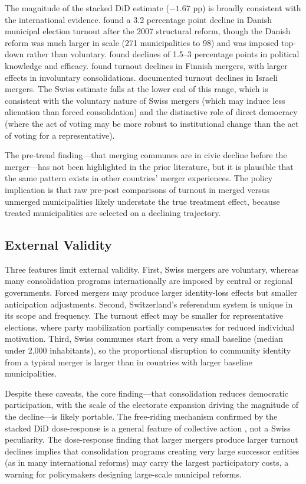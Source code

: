 \documentclass[12pt]{article}
\begin{document}
The magnitude of the stacked DiD estimate ($-1.67$ pp) is broadly consistent with the international evidence. \citet{lassen2011institutional} found a 3.2 percentage point decline in Danish municipal election turnout after the 2007 structural reform, though the Danish reform was much larger in scale (271 municipalities to 98) and was imposed top-down rather than voluntary. \citet{blomhansen2016municipal} found declines of 1.5--3 percentage points in political knowledge and efficacy. \citet{harjunen2021political} found turnout declines in Finnish mergers, with larger effects in involuntary consolidations. \citet{reingewertz2012political} documented turnout declines in Israeli mergers. The Swiss estimate falls at the lower end of this range, which is consistent with the voluntary nature of Swiss mergers (which may induce less alienation than forced consolidation) and the distinctive role of direct democracy (where the act of voting may be more robust to institutional change than the act of voting for a representative).

The pre-trend finding---that merging communes are in civic decline before the merger---has not been highlighted in the prior literature, but it is plausible that the same pattern exists in other countries' merger experiences. The policy implication is that raw pre-post comparisons of turnout in merged versus unmerged municipalities likely understate the true treatment effect, because treated municipalities are selected on a declining trajectory.

\subsection{External Validity}

Three features limit external validity. First, Swiss mergers are voluntary, whereas many consolidation programs internationally are imposed by central or regional governments. Forced mergers may produce larger identity-loss effects but smaller anticipation adjustments. Second, Switzerland's referendum system is unique in its scope and frequency. The turnout effect may be smaller for representative elections, where party mobilization partially compensates for reduced individual motivation. Third, Swiss communes start from a very small baseline (median under 2,000 inhabitants), so the proportional disruption to community identity from a typical merger is larger than in countries with larger baseline municipalities.

Despite these caveats, the core finding---that consolidation reduces democratic participation, with the scale of the electorate expansion driving the magnitude of the decline---is likely portable. The free-riding mechanism confirmed by the stacked DiD dose-response is a general feature of collective action \citep{olson1965logic}, not a Swiss peculiarity. The dose-response finding that larger mergers produce larger turnout declines implies that consolidation programs creating very large successor entities (as in many international reforms) may carry the largest participatory costs, a warning for policymakers designing large-scale municipal reforms.
\end{document}
